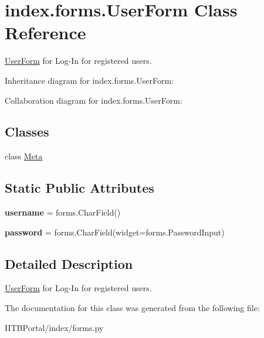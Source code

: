 \hypertarget{classindex_1_1forms_1_1UserForm}{}\section{index.\+forms.\+User\+Form Class Reference}
\label{classindex_1_1forms_1_1UserForm}


\hyperlink{classindex_1_1forms_1_1UserForm}{User\+Form} for Log-\/\+In for registered users.  




Inheritance diagram for index.\+forms.\+User\+Form\+:


Collaboration diagram for index.\+forms.\+User\+Form\+:
\subsection*{Classes}
\begin{DoxyCompactItemize}
\item 
class \hyperlink{classindex_1_1forms_1_1UserForm_1_1Meta}{Meta}
\end{DoxyCompactItemize}
\subsection*{Static Public Attributes}
\begin{DoxyCompactItemize}
\item 
\mbox{\label{classindex_1_1forms_1_1UserForm_a734974863eedf721abaf8f0a3108c1a2}} 
{\bfseries username} = forms.\+Char\+Field()
\item 
\mbox{\label{classindex_1_1forms_1_1UserForm_ab0d0bccdc58f868524aadd9f6afcb1bc}} 
{\bfseries password} = forms.\+Char\+Field(widget=forms.\+Password\+Input)
\end{DoxyCompactItemize}


\subsection{Detailed Description}
\hyperlink{classindex_1_1forms_1_1UserForm}{User\+Form} for Log-\/\+In for registered users. 



The documentation for this class was generated from the following file\+:\begin{DoxyCompactItemize}
\item 
I\+I\+T\+B\+Portal/index/forms.\+py\end{DoxyCompactItemize}

